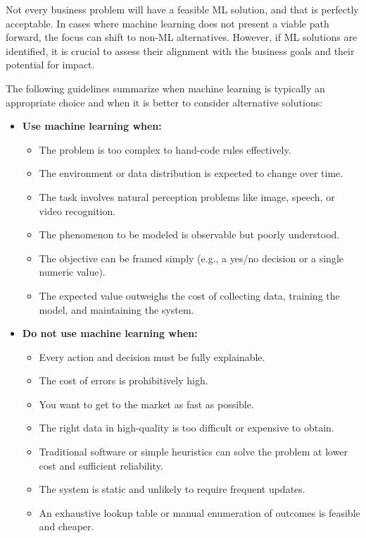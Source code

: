 \documentclass[12pt,openany]{book}
\begin{document}
Not every business problem will have a feasible ML solution, and that is perfectly acceptable. In cases where machine learning does not present a viable path forward, the focus can shift to non-ML alternatives. However, if ML solutions are identified, it is crucial to assess their alignment with the business goals and their potential for impact. \newline

The following guidelines summarize when machine learning is typically an appropriate choice and when it is better to consider alternative solutions:

\begin{itemize}
    \item \textbf{Use machine learning when:}
    \begin{itemize}
        \item The problem is too complex to hand-code rules effectively.
        \item The environment or data distribution is expected to change over time.
        \item The task involves natural perception problems like image, speech, or video recognition.
        \item The phenomenon to be modeled is observable but poorly understood.
        \item The objective can be framed simply (e.g., a yes/no decision or a single numeric value).
        \item The expected value outweighs the cost of collecting data, training the model, and maintaining the system.
    \end{itemize}
    
    \item \textbf{Do not use machine learning when:}
    \begin{itemize}
        \item Every action and decision must be fully explainable.
        \item The cost of errors is prohibitively high.
        \item You want to get to the market as fast as possible.
        \item The right data in high-quality is too difficult or expensive to obtain.
        \item Traditional software or simple heuristics can solve the problem at lower cost and sufficient reliability.
        \item The system is static and unlikely to require frequent updates.
        \item An exhaustive lookup table or manual enumeration of outcomes is feasible and cheaper.
    \end{itemize}
\end{itemize}
\end{document}
